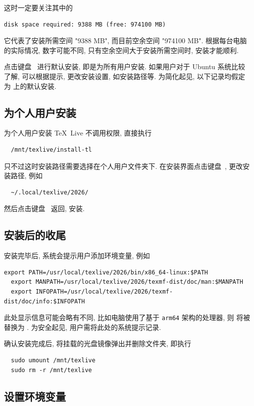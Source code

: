 这时一定要关注其中的
\begin{lstlisting}[language = {}, deleteemph = set]
  disk space required: 9388 MB (free: 974100 MB)
\end{lstlisting}
它代表了安装所需空间 "9388 MB",
而目前空余空间 "974100 MB".
根据每台电脑的实际情况,
数字可能不同,
只有空余空间大于安装所需空间时,
安装才能顺利.

点击键盘\  进行默认安装,
即是为所有用户安装.
如果用户对于 Ubuntu 系统比较了解,
可以根据提示,
更改安装设置,
如安装路径等.
为简化起见,
以下记录均假定为  上的默认安装.

\subsection{为个人用户安装}\label{subsec:ubuntu-user-folder}

为个人用户安装 \TeX~Live 不调用权限,
直接执行
\begin{lstlisting}
  /mnt/texlive/install-tl
\end{lstlisting}
只不过这时安装路径需要选择在个人用户文件夹下.
在安装界面点击键盘\ ,
更改安装路径,
例如
\begin{lstlisting}
  ~/.local/texlive/2026/
\end{lstlisting}
然后点击键盘\  返回,
 安装.

\subsection{安装后的收尾}

安装完毕后,
系统会提示用户添加环境变量,
例如
\begin{lstlisting}[deletekeywords = local]
  export PATH=/usr/local/texlive/2026/bin/x86_64-linux:$PATH
  export MANPATH=/usr/local/texlive/2026/texmf-dist/doc/man:$MANPATH
  export INFOPATH=/usr/local/texlive/2026/texmf-dist/doc/info:$INFOPATH
\end{lstlisting}
此处显示信息可能会略有不同,
比如电脑使用了基于 \texttt{arm64} 架构的处理器,
则  将被替换为 .
为安全起见,
用户需将此处的系统提示记录.

确认安装完成后,
将挂载的光盘镜像弹出并删除文件夹,
即执行
\begin{lstlisting}
  sudo umount /mnt/texlive
  sudo rm -r /mnt/texlive
\end{lstlisting}

\subsection{设置环境变量}\label{sec:ubuntu:env}

